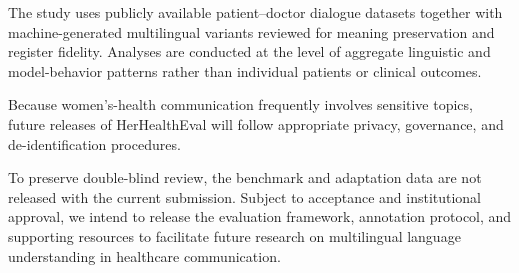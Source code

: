 The study uses publicly available patient--doctor dialogue datasets together with machine-generated multilingual variants reviewed for meaning preservation and register fidelity. Analyses are conducted at the level of aggregate linguistic and model-behavior patterns rather than individual patients or clinical outcomes.

Because women's-health communication frequently involves sensitive topics, future releases of HerHealthEval will follow appropriate privacy, governance, and de-identification procedures.

To preserve double-blind review, the benchmark and adaptation data are not released with the current submission. Subject to acceptance and institutional approval, we intend to release the evaluation framework, annotation protocol, and supporting resources to facilitate future research on multilingual language understanding in healthcare communication.
